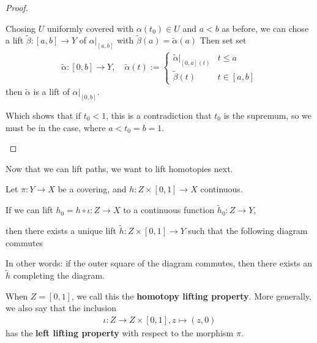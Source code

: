 \begin{proof}
\begin{itemize}
      Chosing $U$ uniformly covered with $\alpha(t_0) \in U$ and $a<b$ as before, we can chose a lift $\tilde{\beta}:[a,b] \to  Y$ of $\alpha|_{[a,b]}$ with $\tilde{\beta}(a) = \tilde{\alpha}(a)$
      Then set set
      \begin{align*}
        \tilde{\alpha}:[0,b] \to  Y, \quad \tilde{\alpha}(t) := \left\{\begin{array}{ll}
            \tilde{\alpha}|_{[0,a](t)} & t \leq a\\
            \tilde{\beta}(t) &  t \in [a,b]
        \end{array} \right.
      \end{align*}
      then $\tilde{\alpha}$ is a lift of $\alpha|_{[0,b]}$.

      Which shows that if $t_0<1$, this is a contradiction that $t_0$ is the supremum, so we must be in the case, where $a < t_0 = b = 1$.
  \end{itemize}
\end{proof}

Now that we can lift paths, we want to lift homotopies next.
\begin{lem}[]\label{lem:homotopy-lift}
  Let $\pi: Y \to X$ be a covering, and $h: Z \times [0,1] \to  X$ continuous.

  If we can lift $h_0 = h \circ \iota: Z \to X$ to a continuous function $\tilde{h}_0: Z \to Y$, 
  
  then there exists a unique lift $\tilde{h}:Z \times [0,1] \to Y$ such that the following diagram commutes
  \begin{center}
  \end{center}
  In other words: if the outer square of the diagram commutes, then there exists an $\tilde{h}$ completing the diagram.

\end{lem}
\begin{rem}[]
  When $Z = [0,1]$, we call this the \textbf{homotopy lifting property}.
  More generally, we also say
  that the inclusion
  \begin{align*}
    \iota: Z \to Z \times [0,1], z \mapsto (z,0)
  \end{align*}
  has the \textbf{left lifting property} with respect to the morphism $\pi$.
\end{rem}
